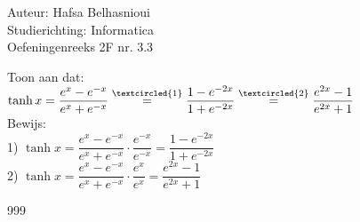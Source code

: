 \documentclass[a4paper]{article}
\begin{document}
\noindent \large Auteur: Hafsa Belhasnioui \\
\noindent \large Studierichting: Informatica\\
\noindent \large Oefeningenreeks 2F nr. 3.3\\

\medskip

\normalsize
 
Toon aan dat: \\

$\tanh x = \dfrac{e^x - e^{-x}}{e^x + e^{-x}} \overset{\textcircled{1}}{=} \dfrac{1 - e^{-2x}}{1 + e^{-2x}} \overset{\textcircled{2}}{=} \dfrac{e^{2x} - 1}{e^{2x} + 1}$\\

Bewijs: \\

1) $\tanh x = \dfrac{e^x - e^{-x}}{e^x + e^{-x}} \cdot \dfrac{e^{-x}}{e^{-x}} = \dfrac{1 - e^{-2x}}{1 + e^{-2x}}$\\

2) $\tanh x = \dfrac{e^x - e^{-x}}{e^x + e^{-x}} \cdot \dfrac{e^x}{e^x} = \dfrac{e^{2x} - 1}{e^{2x} + 1}$\\


\begin{thebibliography}{999}
\end{thebibliography}
\end{document}
